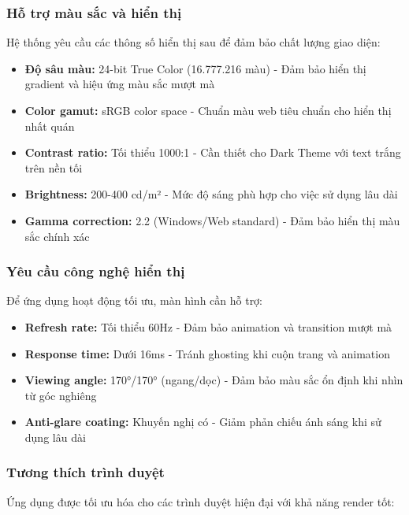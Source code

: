 \subsubsection{Hỗ trợ màu sắc và hiển thị}

Hệ thống yêu cầu các thông số hiển thị sau để đảm bảo chất lượng giao diện:

\begin{itemize}
    \item \textbf{Độ sâu màu:} 24-bit True Color (16.777.216 màu) - Đảm bảo hiển thị gradient và hiệu ứng màu sắc mượt mà
    \item \textbf{Color gamut:} sRGB color space - Chuẩn màu web tiêu chuẩn cho hiển thị nhất quán
    \item \textbf{Contrast ratio:} Tối thiểu 1000:1 - Cần thiết cho Dark Theme với text trắng trên nền tối
    \item \textbf{Brightness:} 200-400 cd/m² - Mức độ sáng phù hợp cho việc sử dụng lâu dài
    \item \textbf{Gamma correction:} 2.2 (Windows/Web standard) - Đảm bảo hiển thị màu sắc chính xác
\end{itemize}

\subsubsection{Yêu cầu công nghệ hiển thị}

Để ứng dụng hoạt động tối ưu, màn hình cần hỗ trợ:

\begin{itemize}
    \item \textbf{Refresh rate:} Tối thiểu 60Hz - Đảm bảo animation và transition mượt mà
    \item \textbf{Response time:} Dưới 16ms - Tránh ghosting khi cuộn trang và animation
    \item \textbf{Viewing angle:} 170°/170° (ngang/dọc) - Đảm bảo màu sắc ổn định khi nhìn từ góc nghiêng
    \item \textbf{Anti-glare coating:} Khuyến nghị có - Giảm phản chiếu ánh sáng khi sử dụng lâu dài
\end{itemize}

\subsubsection{Tương thích trình duyệt}

Ứng dụng được tối ưu hóa cho các trình duyệt hiện đại với khả năng render tốt:


